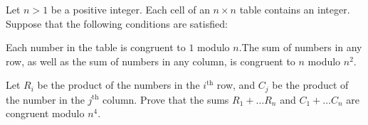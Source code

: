 Let $n>1$ be a positive integer. Each cell of an $n\times n$ table contains an integer. Suppose that the following conditions are satisfied:

Each number in the table is congruent to $1$ modulo $n$.The sum of numbers in any row, as well as the sum of numbers in any column, is congruent to $n$ modulo $n^2$.

Let $R_i$ be the product of the numbers in the $i^{\text{th}}$ row, and $C_j$ be the product of the number in the $j^{\text{th}}$ column. Prove that the sums $R_1+\hdots R_n$ and $C_1+\hdots C_n$ are congruent modulo $n^4$.
